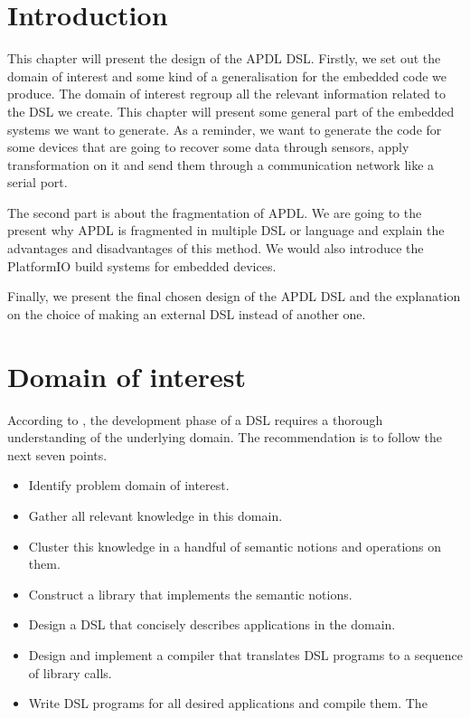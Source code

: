 \label{chap:dsl_design}

\section{Introduction}
\label{sec:design_intro}

This chapter will present the design of the \gls{APDL} \gls{DSL}. Firstly, we
set out the domain of interest and some kind of a generalisation for the embedded
code we produce. The domain of interest regroup all the relevant information
related to the \gls{DSL} we create. This chapter will present some general part
of the embedded systems we want to generate. As a reminder, we want to generate
the code for some devices that are going to recover some data through
sensors, apply transformation on it and send them through a communication network
like a serial port.

The second part is about the fragmentation of \gls{APDL}. We are going to the
present why \gls{APDL} is fragmented in multiple \gls{DSL} or language and explain
the advantages and disadvantages of this method. We would also introduce the
PlatformIO build systems for embedded devices.

Finally, we present the final chosen design of the \gls{APDL} \gls{DSL} and the
explanation on the choice of making an external \gls{DSL} instead of another
one.

\section{Domain of interest}
\label{sec:design_domain_of_interest}

According to \cite{little_languages_little_maintenance}, the development phase
of a \gls{DSL} requires a thorough understanding of the underlying domain. The
recommendation is to follow the next seven points\cite{little_languages_little_maintenance}.

\begin{itemize}
\item Identify problem domain of interest.
\item Gather all relevant knowledge in this domain.
\item Cluster this knowledge in a handful of semantic notions and operations on them.
\item Construct a library that implements the semantic notions.
\item Design a DSL that concisely describes applications in the domain.
\item Design and implement a compiler that translates DSL programs to a sequence of library calls.
\item Write DSL programs for all desired applications and compile them. The
\end{itemize}

